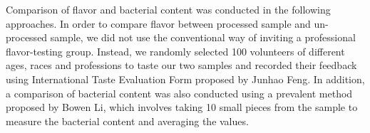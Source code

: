 \documentclass[a4paper,12pt]{article}
\begin{document}
	Comparison of flavor and bacterial content was conducted in the following approaches. In order to compare flavor between processed sample and un-processed sample, we did not use the conventional way of inviting a professional flavor-testing group\cite{zxh}. Instead, we randomly selected 100 volunteers of different ages, races and professions to taste our two samples and recorded their feedback using International Taste Evaluation Form proposed by Junhao Feng\cite{fjh}. In addition, a comparison of bacterial content was also conducted using a prevalent method proposed by Bowen Li\cite{lbw}, which involves taking 10 small pieces from the sample to measure the bacterial content and averaging the values. 
	
	
	
\end{document}
